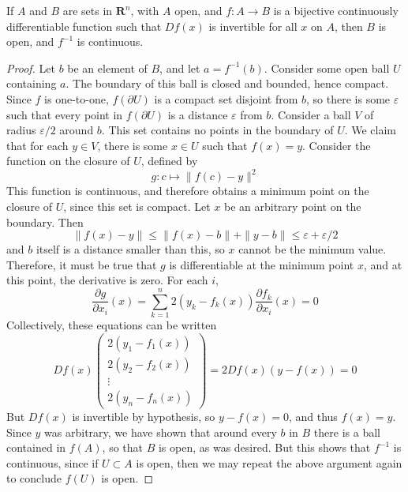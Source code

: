 \begin{lemma}
    If $A$ and $B$ are sets in $\mathbf{R}^n$, with $A$ open, and $f:A \to B$ is a bijective continuously differentiable function such that $Df(x)$ is invertible for all $x$ on $A$, then $B$ is open, and $f^{-1}$ is continuous.
\end{lemma}
\begin{proof}
    Let $b$ be an element of $B$, and let $a = f^{-1}(b)$. Consider some open ball $U$ containing $a$. The boundary of this ball is closed and bounded, hence compact. Since $f$ is one-to-one, $f(\partial U)$ is a compact set disjoint from $b$, so there is some $\varepsilon$ such that every point in $f(\partial U)$ is a distance $\varepsilon$ from $b$. Consider a ball $V$ of radius $\varepsilon/2$ around $b$. This set contains no points in the boundary of $U$. We claim that for each $y \in V$, there is some $x \in U$ such that $f(x) = y$. Consider the function on the closure of $U$, defined by
    \[ g: c \mapsto \|f(c) - y \|^2 \]
    This function is continuous, and therefore obtains a minimum point on the closure of $U$, since this set is compact. Let $x$ be an arbitrary point on the boundary. Then
    \[ \| f(x) - y \| \leq \| f(x) - b \| + \| y - b \| \leq \varepsilon + \varepsilon/2 \]
    and $b$ itself is a distance smaller than this, so $x$ cannot be the minimum value. Therefore, it must be true that $g$ is differentiable at the minimum point $x$, and at this point, the derivative is zero. For each $i$,
    \[ \frac{\partial g}{\partial x_i}(x) = \sum_{k = 1}^n 2(y_k - f_k(x)) \frac{\partial f_k}{\partial x_i}(x) = 0 \]
    Collectively, these equations can be written
    \[ Df(x) \begin{pmatrix} 2(y_1 - f_1(x)) \\ 2(y_2 - f_2(x)) \\ \vdots \\ 2(y_n - f_n(x)) \end{pmatrix} = 2 Df(x) (y - f(x)) = 0 \]
    But $Df(x)$ is invertible by hypothesis, so $y - f(x) = 0$, and thus $f(x) = y$. Since $y$ was arbitrary, we have shown that around every $b$ in $B$ there is a ball contained in $f(A)$, so that $B$ is open, as was desired. But this shows that $f^{-1}$ is continuous, since if $U \subset A$ is open, then we may repeat the above argument again to conclude $f(U)$ is open.
\end{proof}

